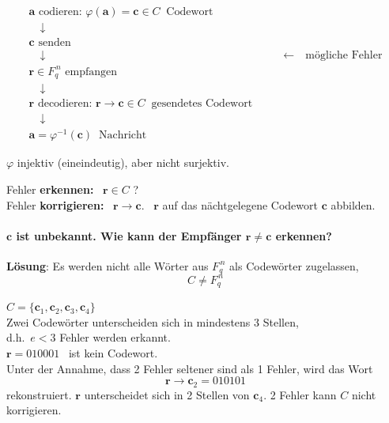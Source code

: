 \[
\begin{array}{ll}
\mathbf{a} \text{ codieren: } \varphi(\mathbf{a}) = \mathbf{c} \in C \ \text{ Codewort} & \\
\quad\downarrow & \\
\mathbf{c} \text{ senden} & \\
\quad\downarrow & \qquad\leftarrow \quad \text{mögliche Fehler} \\
\mathbf{r} \in F_q^{\,n} \text{ empfangen} & \\
\quad\downarrow & \\
\mathbf{r} \text{ decodieren: } \mathbf{r} \to \mathbf{c} \in C \ \text{ gesendetes Codewort} & \\
\quad\downarrow & \\
\mathbf{a} = \varphi^{-1}(\mathbf{c}) \ \text{ Nachricht} &
\end{array}
\]

$\varphi$ injektiv (eineindeutig), aber nicht surjektiv.

Fehler \textbf{erkennen:} \ $\mathbf{r} \in C$ ?\\
Fehler \textbf{korrigieren:} \ $\mathbf{r} \to \mathbf{c}$. \ $\mathbf{r}$ auf das nächtgelegene Codewort $\mathbf{c}$ abbilden.

\paragraph{$\mathbf{c}$ ist unbekannt. Wie kann der Empfänger $\mathbf{r} \neq \mathbf{c}$ erkennen?}
\textbf{Lösung}: Es werden nicht alle Wörter aus $F_q^{\,n}$ als Codewörter zugelassen,
\[ C \neq F_q^{\,n} \]

\begin{beispiel}
$C = \{\mathbf{c}_1, \mathbf{c}_2, \mathbf{c}_3, \mathbf{c}_4\}$\\
Zwei Codewörter unterscheiden sich in mindestens 3 Stellen,\\
d.h.\ $e < 3$ Fehler werden erkannt.\\
$\mathbf{r} = 010001$ \ ist kein Codewort.\\
Unter der Annahme, dass 2 Fehler seltener sind als 1 Fehler, wird das Wort
\[ \mathbf{r} \to \mathbf{c}_2 = 010101 \]
rekonstruiert.
$\mathbf{r}$ unterscheidet sich in 2 Stellen von $\mathbf{c}_4$. 2 Fehler kann $C$ nicht korrigieren.
\end{beispiel}

